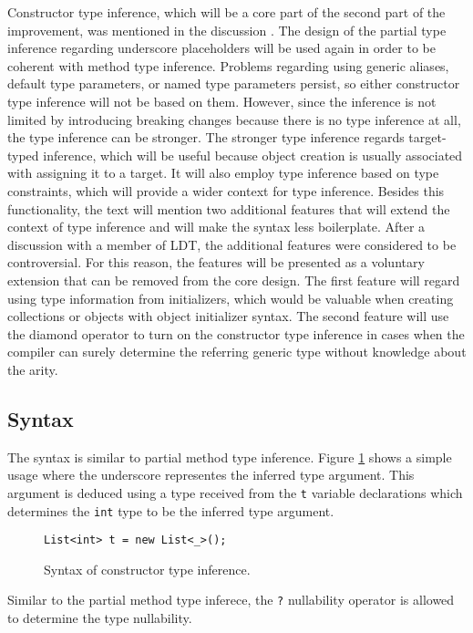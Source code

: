 Constructor type inference, which will be a core part of the second part of the improvement, was mentioned in the discussion \cite{online:CtorTInf}. 
The design of the partial type inference regarding underscore placeholders will be used again in order to be coherent with method type inference. 
Problems regarding using generic aliases, default type parameters, or named type parameters persist, so either constructor type inference will not be based on them. 
However, since the inference is not limited by introducing breaking changes because there is no type inference at all, the type inference can be stronger. 
The stronger type inference regards target-typed inference, which will be useful because object creation is usually associated with assigning it to a target. 
It will also employ type inference based on type constraints, which will provide a wider context for type inference. 
Besides this functionality, the text will mention two additional features that will extend the context of type inference and will make the syntax less boilerplate.
After a discussion with a member of \ac{LDT}, the additional features were considered to be controversial. 
For this reason, the features will be presented as a voluntary extension that can be removed from the core design. 
The first feature will regard using type information from initializers, which would be valuable when creating collections or objects with object initializer syntax. 
The second feature will use the diamond operator to turn on the constructor type inference in cases when the compiler can surely determine the referring generic type without knowledge about the arity.

\subsection{Syntax}

The syntax is similar to partial method type inference.
Figure \ref{img56:constructorTypeInferenceExample} shows a simple usage where the underscore representes the inferred type argument.
This argument is deduced using a type received from the \texttt{t} variable declarations which determines the \texttt{int} type to be the inferred type argument.
\begin{figure}[h!]
\begin{lstlisting}[style=csharp, mathescape=true]
List<int> t = new List<_>();
\end{lstlisting}
\caption{Syntax of constructor type inference.}
\label{img56:constructorTypeInferenceExample}
\end{figure}
\par
Similar to the partial method type inferece, the \texttt{?} nullability operator is allowed to determine the type nullability.

